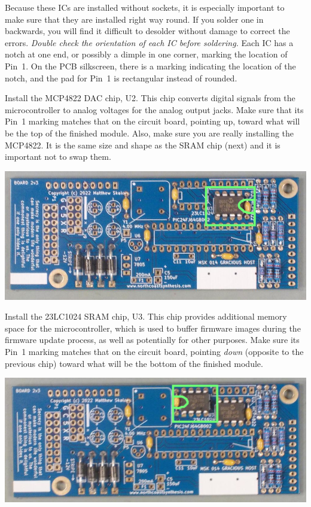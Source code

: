 Because these ICs are installed without sockets, it is especially important to
make sure that they are installed right way round.  If you solder one in
backwards, you will find it difficult to desolder without damage to correct
the errors.  \emph{Double check the orientation of each IC before
soldering.}  Each IC has a notch at one end, or possibly a dimple in
one corner, marking the location of Pin~1.  On the PCB silkscreen, there is
a marking indicating the location of the notch, and the pad for Pin~1 is
rectangular instead of rounded.

Install the MCP4822 DAC chip, U2.  This chip converts digital signals from
the microcontroller to analog voltages for the analog output jacks.  Make
sure that its Pin~1 marking matches that on the circuit board, pointing up,
toward what will be the top of the finished module.  Also, make sure you are
really installing the MCP4822.  It is the same size and shape as the SRAM
chip (next) and it is important not to swap them.

\nopagebreak
\noindent\includegraphics[width=\linewidth]{mcp4822.jpg}

Install the 23LC1024 SRAM chip, U3.  This chip provides additional memory
space for the microcontroller, which is used to buffer firmware images
during the firmware update process, as well as potentially for other purposes.
Make sure its Pin~1 marking matches that on the circuit board, pointing
\emph{down} (opposite to the previous chip) toward what will be the bottom
of the finished module.

\nopagebreak
\noindent\includegraphics[width=\linewidth]{23lc1024.jpg}

